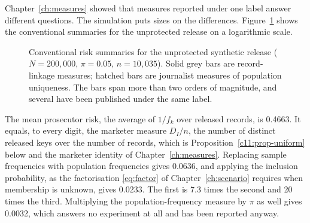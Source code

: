 Chapter~\ref{ch:measures} showed that measures reported under one label answer
different questions. The simulation puts sizes on the differences.
Figure~\ref{c11:fig-measures} shows the conventional summaries for the unprotected
release on a logarithmic scale.

\begin{figure}[ht]
\centering
{}
\caption{Conventional risk summaries for the unprotected synthetic release
($N = 200{,}000$, $\pi = 0.05$, $n = 10{,}035$). Solid grey bars are
record-linkage measures; hatched bars are journalist measures of population
uniqueness. The bars span more than two orders of magnitude, and several have been
published under the same label.}
\label{c11:fig-measures}
\end{figure}

The mean prosecutor risk, the average of $1/f_k$ over released records, is 0.4663.
It equals, to every digit, the marketer measure $D_I/n$, the number of distinct
released keys over the number of records, which is Proposition~\ref{c11:prop-uniform}
below and the marketer identity of Chapter~\ref{ch:measures}. Replacing
sample frequencies with population frequencies gives 0.0636, and applying the
inclusion probability, as the factorisation \eqref{eq:factor} of
Chapter~\ref{ch:scenario} requires when membership is unknown, gives 0.0233. The
first is 7.3 times the second and 20 times the third.
Multiplying the population-frequency measure by $\pi$ as well gives 0.0032, which
answers no experiment at all and has been reported anyway.

